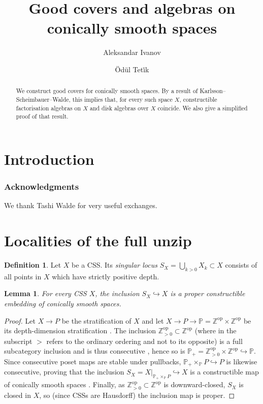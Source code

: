 \documentclass[11pt]{amsart}
\title{{Good covers and algebras on conically smooth spaces}}
\author{Aleksandar Ivanov}
\author{\"Od\"ul Tet\.{i}k}
\date{}
\newcommand{\mbb}[1]{\mathbb{#1}}
\newcommand{\opp}{{\mathrm{op}}}
\numberwithin{equation}{section}
\theoremstyle{definition}
\newtheorem{definition}[equation]{Definition}%
\theoremstyle{remark}
\theoremstyle{plain}
\newtheorem{lemma}[equation]{Lemma}
\begin{document}
\maketitle

\begin{abstract}
    We construct good covers for conically smooth spaces. By a result of Karlsson--Scheimbauer--Walde, this implies that, for every such space $X$, constructible factorisation algebras on $X$ and disk algebras over $X$ coincide. We also give a simplified proof of that result.
\end{abstract}



\tableofcontents

\section{Introduction}

\subsubsection*{Acknowledgments} We thank Tashi Walde for very useful exchanges.

\section{Localities of the full unzip}


\begin{definition}
    Let $X$ be a CSS. Its \emph{singular locus} $S_X=\bigcup_{k>0} X_k\subset X$ consists of all points in $X$ which have strictly positive depth.
\end{definition}

\begin{lemma}\label{8W651JS}
    For every CSS $X$, the inclusion $S_X\hookrightarrow X$ is a proper constructible embedding of conically smooth spaces.
\end{lemma}
\begin{proof}
    Let $X\to P$ be the stratification of $X$ and let $X\to P\to\mbb{P}=\mbb{Z}^{\opp}\times\mbb{Z}^{\opp}$ be its depth-dimension stratification \cite[Lemma 2.4.10]{ayala2017local}. The inclusion $\mbb{Z}_{>0}^{\opp}\subset\mbb{Z}^\opp$ (where in the subscript $>$ refers to the ordinary ordering and not to its opposite) is a full subcategory inclusion and is thus consecutive \cite[Definition 2.3.1]{ayala2017local}, hence so is $\mbb{P}_{+}=\mbb{Z}_{>0}^\opp\times\mbb{Z}^\opp\hookrightarrow\mbb{P}$. Since consecutive poset maps are stable under pullbacks, $\mbb{P}_{+}\times_{\mbb{P}}P\hookrightarrow P$ is likewise consecutive, proving that the inclusion $S_X=X|_{\mbb{P}_+\times_{\mbb{P}}P}\hookrightarrow X$ is a constructible map of conically smooth spaces \cite[Lemma 3.4.5, Example 3.4.7]{ayala2017local}. Finally, as $\mbb{Z}_{>0}^{\opp}\subset\mbb{Z}^\opp$ is downward-closed, $S_X$ is closed in $X$, so (since CSSs are Hausdorff) the inclusion map is proper.
\end{proof}
\end{document}
